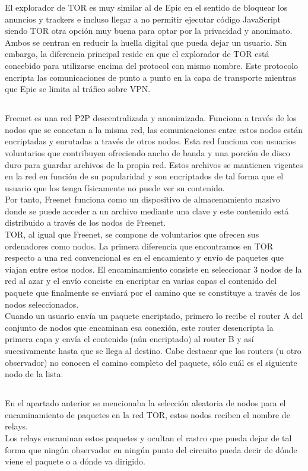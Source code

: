 \documentclass[10pt,a4paper]{article}
\begin{document}
El explorador de TOR es muy similar al de Epic en el sentido de bloquear los anuncios y trackers e incluso llegar a no permitir ejecutar código JavaScript siendo TOR otra opción muy buena para optar por la privacidad y anonimato. Ambos se centran en reducir la huella digital que pueda dejar un usuario. Sin embargo, la diferencia principal reside en que el explorador de TOR está concebido para utilizarse encima del protocol con mismo nombre. Este protocolo encripta las comunicaciones de punto a punto en la capa de transporte mientras que Epic se limita al tráfico sobre VPN.

\subsection{}
Freenet es una red P2P descentralizada y anonimizada. Funciona a través de los nodos que se conectan a la misma red, las comunicaciones entre estos nodos están encriptadas y enrutadas a través de otros nodos. Esta red funciona con usuarios voluntarios que contribuyen ofreciendo ancho de banda y una porción de disco duro para guardar archivos de la propia red. Estos archivos se mantienen vigentes en la red en función de su popularidad y son encriptados de tal forma que el usuario que los tenga físicamente no puede ver su contenido.\\
Por tanto, Freenet funciona como un dispositivo de almacenamiento masivo donde se puede acceder a un archivo mediante una clave y este contenido está distribuido a través de los nodos de Freenet.\\

TOR, al igual que Freenet, se compone de voluntarios que ofrecen sus ordenadores como nodos. La primera diferencia que encontramos en TOR respecto a una red convencional es en el encamiento y envío de paquetes que viajan entre estos nodos. El encaminamiento consiste en seleccionar 3 nodos de la red al azar y el envío conciste en encriptar en varias capas el contenido del paquete que finalmente se enviará por el camino que se constituye a través de los nodos seleccionados.\\
Cuando un usuario envía un paquete encriptado, primero lo recibe el router A del conjunto de nodos que encaminan esa conexión, este router desencripta la primera capa y envía el contenido (aún encriptado) al router B y así sucesivamente hasta que se llega al destino. Cabe destacar que los routers (u otro observador) no conocen el camino completo del paquete, sólo cuál es el siguiente nodo de la lista.
\subsection{}
En el apartado anterior se mencionaba la selección aleatoria de nodos para el encaminamiento de paquetes en la red TOR, estos nodos reciben el nombre de relays.\\
Los relays encaminan estos paquetes y ocultan el rastro que pueda dejar de tal forma que ningún observador en ningún punto del circuito pueda decir de dónde viene el paquete o a dónde va dirigido.
\end{document}
